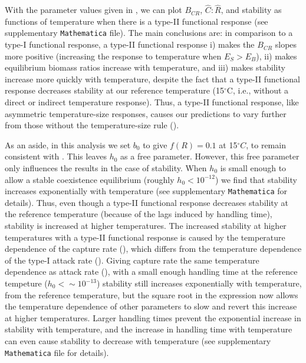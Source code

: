 \documentclass[11pt]{article}
\begin{document}
With the parameter values given in \cite{Rall2012}, we can plot $B_{CR}$, $\hat{C}:\hat{R}$, and stability as functions of temperature when there is a type-II functional response (see supplementary \texttt{Mathematica} file).
The main conclusions are: in comparison to a type-I functional response, a type-II functional response i) makes the $B_{CR}$ slopes more positive (increasing the response to temperature when $E_S > E_B$), ii) makes equilibrium biomass ratios increase with temperature, and iii) makes stability increase more quickly with temperature, despite the fact that a type-II functional response decreases stability at our reference temperature (15$^\circ$C, i.e., without a direct or indirect temperature response).
Thus, a type-II functional response, like asymmetric temperature-size responses, causes our predictions to vary further from those without the temperature-size rule (\cite{Gilbert2014}).
%
%

As an aside, in this analysis we set $b_0$ to give $f(R) = 0.1$ at 15$^\circ C$, to remain consistent with \cite{Gilbert2014}.
This leaves $h_0$ as a free parameter. 
However, this free parameter only influences the results in the case of stability.
When $h_0$ is small enough to allow a stable coexistence equilibrium (roughly $h_0 <10^{-12}$) we find that stability increases exponentially with temperature (see supplementary \texttt{Mathematica} for details).
Thus, even though a type-II functional response decreases stability at the reference temperature (because of the lags induced by handling time), stability is increased at higher temperatures. 
The increased stability at higher temperatures with a type-II functional response is caused by the temperature dependence of the capture rate (\cite{Rall2012}), which differs from the temperature dependence of the type-I attack rate (\cite{Gilbert2014}).
Giving capture rate the same temperature dependence as attack rate (\cite{Gilbert2014}), with a small enough handling time at the reference tempeture ($h_0 <\sim10^{-13}$) stability still increases exponentially with temperature, from the reference temperature, but the square root in the expression now allows the temperature dependence of other parameters to slow and revert this increase at higher temperatures.
Larger handling times prevent the exponential increase in stability with temperature, and the increase in handling time with temperature can even cause stability to decrease with temperature (see supplementary \texttt{Mathematica} file for details). 
\end{document}
